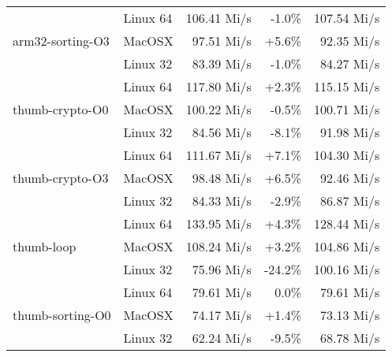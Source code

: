 \documentclass[conference]{ieeeconf}
\begin{document}
\begin{table}
\begin{tabular}{l|l|rr|r}
\multirow{3}{*}{arm32-sorting-O3} & Linux 64  & 106.41 Mi/s\hspace*{-2.5mm} & -1.0\% & 107.54 Mi/s \\
                                  & MacOSX    & 97.51 Mi/s\hspace*{-2.5mm}  & +5.6\% & 92.35 Mi/s  \\
                                  & Linux 32  & 83.39 Mi/s\hspace*{-2.5mm}  & -1.0\% & 84.27 Mi/s  \\\hline

\multirow{3}{*}{thumb-crypto-O0}  & Linux 64  & 117.80 Mi/s\hspace*{-2.5mm} & +2.3\% & 115.15 Mi/s \\
                                  & MacOSX    & 100.22 Mi/s\hspace*{-2.5mm} & -0.5\% & 100.71 Mi/s \\
                                  & Linux 32  & 84.56 Mi/s\hspace*{-2.5mm}  & -8.1\% & 91.98 Mi/s  \\\hline

\multirow{3}{*}{thumb-crypto-O3}  & Linux 64  & 111.67 Mi/s\hspace*{-2.5mm} & +7.1\% & 104.30 Mi/s \\
                                  & MacOSX    & 98.48 Mi/s\hspace*{-2.5mm}  & +6.5\% & 92.46 Mi/s  \\
                                  & Linux 32  & 84.33 Mi/s\hspace*{-2.5mm}  & -2.9\% & 86.87 Mi/s  \\\hline

\multirow{3}{*}{thumb-loop}       & Linux 64  & 133.95 Mi/s\hspace*{-2.5mm} & +4.3\% & 128.44 Mi/s \\
                                  & MacOSX    & 108.24 Mi/s\hspace*{-2.5mm} & +3.2\% & 104.86 Mi/s \\
                                  & Linux 32  & 75.96 Mi/s\hspace*{-2.5mm}  &\hspace*{-2.5mm}-24.2\% & 100.16 Mi/s \\\hline

\multirow{3}{*}{thumb-sorting-O0} & Linux 64  & 79.61 Mi/s\hspace*{-2.5mm}  &  0.0\% & 79.61 Mi/s  \\
                                  & MacOSX    & 74.17 Mi/s\hspace*{-2.5mm}  & +1.4\% & 73.13 Mi/s  \\
                                  & Linux 32  & 62.24 Mi/s\hspace*{-2.5mm}  & -9.5\% & 68.78 Mi/s  \\\hline


\end{tabular}
\end{table}
\end{document}
